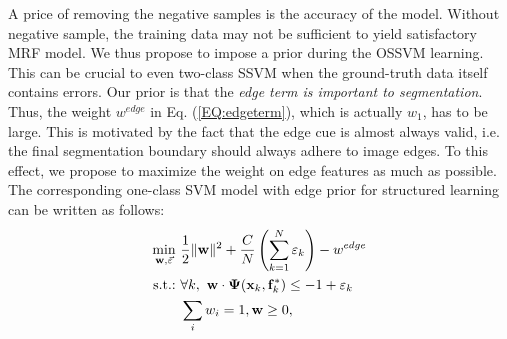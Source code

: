 \documentclass[10pt,journal,compsoc]{newIEEEtran}
\begin{document}
 A price of removing the negative samples is the accuracy of the model. Without negative sample, the training data may not be sufficient to yield satisfactory MRF model. We thus propose to impose a prior during the OSSVM learning. This can be crucial to even two-class SSVM when the ground-truth data itself contains errors. Our prior is that the \emph{edge term is important to segmentation}. Thus, the weight $w^{edge}$ in Eq. (\ref{EQ:edgeterm}), which is actually $w_1$, has to be large. This is motivated by the fact that the edge cue is almost always valid, i.e. the final segmentation boundary should always adhere to image edges. To this effect, we propose to maximize the weight on edge features as much as possible. The corresponding one-class SVM model with edge prior for structured learning can be written as follows:
\begin{equation}\label{EQ:OSSVM_wp}
\begin{split}
\min_{\mathbf{w},\vec{\varepsilon}}~& {1\over2}\|\mathbf{w}\|^2 + {C\over N}\left(\sum_{k=1}^N \varepsilon_k\right) - w^{edge} \\
\hbox{s.t.:}~&  \forall k,~ \mathbf{w}\cdot\mathbf{\Psi}(\mathbf{x}_k,\mathbf{f}^*_k)\leq -1+\varepsilon_k \\
             &  \sum_i w_i=1, \mathbf{w}\geq 0, \\
\end{split}
\end{equation}%
\end{document}
